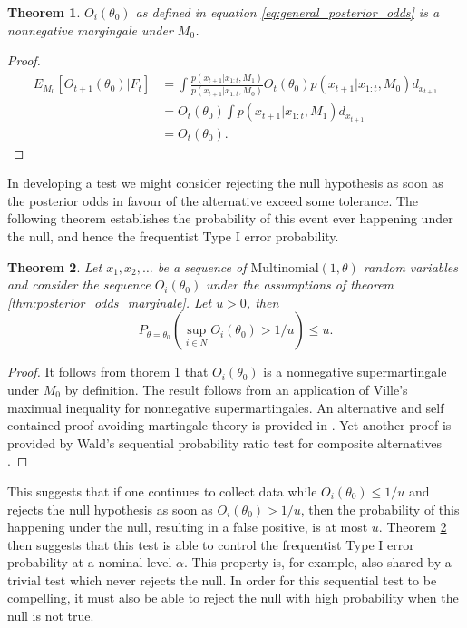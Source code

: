 \documentclass[11pt]{article}
\newtheorem{thm}{Theorem}[section]
\begin{document}
\begin{thm}
  $O_i(\theta_0)$ as defined in equation \eqref{eq:general_posterior_odds} is a nonnegative margingale under $M_0$.
  \label{thm:posterior_odds_martingale}
    \end{thm}
  \begin{proof}
  \begin{align}
    E_{M_0}[O_{t+1}(\theta_0)|F_{t}]  &= \int \frac{p(x_{t+1}|x_{1:t},M_1)}{p(x_{t+1}|x_{1:t},M_0)} O_{t}(\theta_0) p(x_{t+1}|x_{1:t},M_0) d_{x_{t+1}}\\
    &=  O_{t}(\theta_0) \int p(x_{t+1}|x_{1:t},M_1) d_{x_{t+1}}\\
    &=  O_{t}(\theta_0).
  \end{align}
\end{proof}
In developing a test we might consider rejecting the null hypothesis as soon as the posterior odds in favour of the alternative exceed some tolerance. The following theorem establishes the probability of this event ever happening under the null, and hence the frequentist Type I error probability.
\begin{thm}
  \label{thm:type_1_error}
Let $x_1, x_2,\dots $ be a sequence of $\text{Multinomial}(1,\theta)$ random variables and consider the sequence $O_i(\theta_0)$ under the assumptions of theorem \ref{thm:posterior_odds_marginale}. Let $u >0$, then
\begin{equation}
  P_{\theta = \theta_0}\left( \sup_{i\in N} O_i(\theta_0) > 1/u \right) \leq u.
\end{equation}
\end{thm}
\begin{proof}
It follows from thorem \ref{thm:posterior_odds_martingale} that $O_i(\theta_0)$ is a nonnegative supermartingale under $M_0$ by definition. The result follows from an application of Ville's maximual inequality for nonnegative supermartingales. An alternative and self contained proof avoiding martingale theory is provided in \cite{robbins}. Yet another proof is provided by Wald's sequential probability ratio test for composite alternatives \cite{wald}.
\end{proof}
This suggests that if one continues to collect data while $O_i(\theta_0) \leq 1/u$ and rejects the null hypothesis as soon as $O_i(\theta_0) > 1/u$, then the probability of this happening under the null, resulting in a false positive, is at most $u$. Theorem \ref{thm:type_1_error} then suggests that this test is able to control the frequentist Type I error probability at a nominal level $\alpha$. This property is, for example, also shared by a trivial test which never rejects the null. In order for this sequential test to be compelling, it must also be able to reject the null with high probability when the null is not true.
\end{document}
